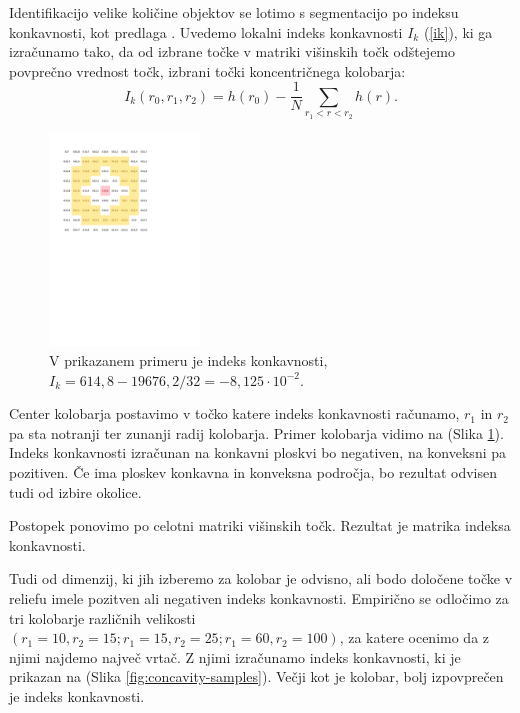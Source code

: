 \documentclass[a4paper, twoside, 12pt]{book}
\begin{document}
Identifikacijo velike količine objektov se lotimo s segmentacijo po indeksu konkavnosti, kot predlaga \cite{doctor13}. Uvedemo lokalni indeks konkavnosti $I_k$ (\ref{ik}), ki ga izračunamo tako, da od izbrane točke v matriki višinskih točk odštejemo povprečno vrednost točk, izbrani točki koncentričnega kolobarja:
\begin{equation}  I_k(r_0,r_1,r_2) = h(r_0)- \frac{1}{N}\sum\limits_{r_1<r<r_2} h(r). \label{ik} \end{equation}

  \begin{figure}[h!]
    \begin{center}
      \includegraphics[width=4cm]{slike/concavity-ring-visualisation-2}
    \end{center}
    \caption{V prikazanem primeru je indeks konkavnosti, $I_k = 614,8 - 19676,2/32 = - 8,125 \cdot 10^{-2}$.}
    \label{fig:concavity-ring}
  \end{figure}

Center kolobarja postavimo v točko katere indeks konkavnosti računamo, $r_1$ in $r_2$ pa sta notranji ter zunanji radij kolobarja.
Primer kolobarja vidimo na (Slika \ref{fig:concavity-ring}). Indeks konkavnosti izračunan na konkavni ploskvi bo negativen, na konveksni pa pozitiven. Če ima ploskev konkavna in konveksna področja, bo rezultat odvisen tudi od izbire okolice.

Postopek ponovimo po celotni matriki višinskih točk. Rezultat je matrika indeksa konkavnosti.

Tudi od dimenzij, ki jih izberemo za kolobar je odvisno, ali bodo določene točke v reliefu imele pozitven ali negativen indeks konkavnosti. Empirično se odločimo za tri kolobarje različnih velikosti $(r_1=10,r_2=15;r_1=15,r_2=25;r_1=60,r_2=100)$, za katere ocenimo da z njimi najdemo največ vrtač. Z njimi izračunamo indeks konkavnosti, ki je prikazan na (Slika \ref{fig:concavity-samples}). Večji kot je kolobar, bolj izpovprečen je indeks konkavnosti.
\end{document}
